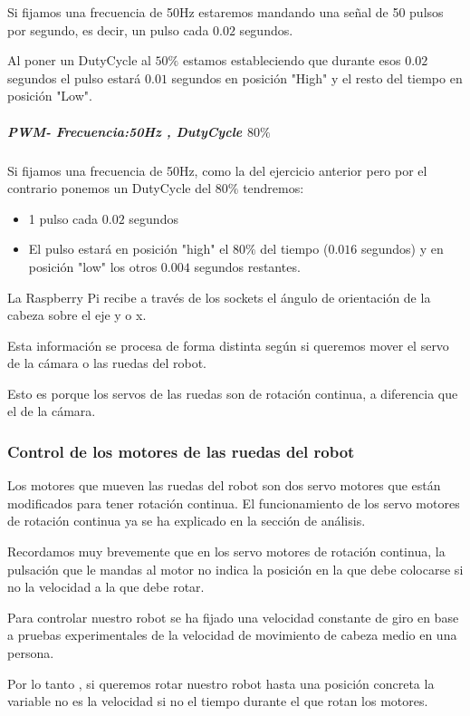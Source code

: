 \documentclass[twoside, 12pt]{epstfg}
\begin{document}
Si fijamos una frecuencia de 50Hz estaremos mandando una señal de 50 pulsos por segundo, es decir, un pulso cada $0.02$ segundos.

Al poner un DutyCycle al $50\%$ estamos estableciendo que durante esos $0.02$ segundos el pulso estará $0.01$ segundos en posición "High" y el resto del tiempo en posición "Low".


\subparagraph {PWM- Frecuencia:50Hz , DutyCycle $80\%$}

Si fijamos una frecuencia de 50Hz, como la del ejercicio anterior pero por el contrario ponemos un DutyCycle del $80\%$ tendremos:
\begin{itemize}
	\item 1 pulso cada $0.02$ segundos
	\item El pulso estará en posición "high" el $80\%$ del tiempo ($0.016$ segundos) y en posición "low" los otros $0.004$ segundos restantes.
\end{itemize}



La Raspberry Pi recibe a través de los sockets el ángulo de orientación de la cabeza sobre el eje y o x.


Esta información se procesa de forma distinta según si queremos mover el servo de la cámara o las ruedas del robot.

Esto es porque los servos de las ruedas son de rotación continua, a diferencia que el de la cámara.

\subsubsection{Control de los motores de las ruedas del robot}

Los motores que mueven las ruedas del robot son dos servo motores que están modificados para tener rotación continua. El funcionamiento de los servo motores de rotación continua ya se ha explicado en la sección de análisis.

Recordamos muy brevemente que en los servo motores de rotación continua, la pulsación que le mandas al motor no indica la posición en la que debe colocarse si no la velocidad a la que debe rotar.

Para controlar nuestro robot se ha fijado una velocidad constante de giro en base a pruebas experimentales de la velocidad de movimiento de cabeza medio en una persona.

Por lo tanto , si queremos rotar nuestro robot hasta una posición concreta la variable no es la velocidad si no el tiempo durante el que rotan los motores.
\end{document}
